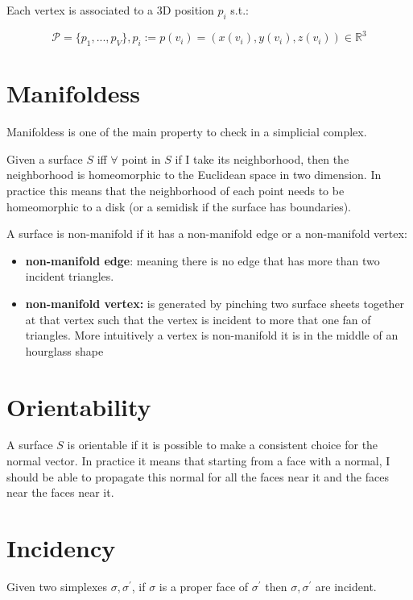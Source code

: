  Each vertex is associated to a 3D position $p_{i}$ s.t.:

\begin{equation*}
    \mathcal{P} = \{p_{1}, ..., p_{V}\}, p_{i} := p(v_{i}) = (x(v_{i}), y(v_{i}), z(v_{i})) \in \mathbb{R}^{3}
\end{equation*}


\section{Manifoldess}
Manifoldess is one of the main property to check in a simplicial complex.\par
Given a surface $S$ iff $\forall$ point in $S$ if I take its neighborhood, then the neighborhood is homeomorphic to the Euclidean space in two dimension. In practice this means that the neighborhood of each point needs to be homeomorphic to a disk (or a semidisk if the surface has boundaries).\par

A surface is non-manifold if it has a non-manifold edge or a non-manifold vertex:
\begin{itemize}
    \item \textbf{non-manifold edge}: meaning there is no edge that has more than two incident triangles.
    \item \textbf{non-manifold vertex:} is generated by pinching two surface sheets together at that vertex such that the vertex is incident to more that one fan of triangles. More intuitively a vertex is non-manifold it is in the middle of an hourglass shape
\end{itemize}


\section{Orientability}
A surface $S$ is orientable if it is possible to make a consistent choice for the normal vector. In practice it means that starting from a face with a normal, I should be able to propagate this normal for all the faces near it and the faces near the faces near it.

\section{Incidency}
Given two simplexes $\sigma, \sigma^{'}$, if $\sigma$ is a proper face of $\sigma^{'}$ then $\sigma, \sigma^{'}$ are incident.

